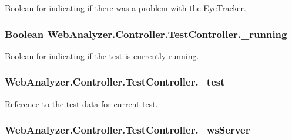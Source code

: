 Boolean for indicating if there was a problem with the Eye\+Tracker. 

\hypertarget{class_web_analyzer_1_1_controller_1_1_test_controller_a49aaaa975ccbeedcd52fb03288cea3ef}{}
\subsubsection[{\+\_\+running}]{\setlength{\rightskip}{0pt plus 5cm}Boolean Web\+Analyzer.\+Controller.\+Test\+Controller.\+\_\+running\hspace{0.3cm}{\ttfamily [private]}}\label{class_web_analyzer_1_1_controller_1_1_test_controller_a49aaaa975ccbeedcd52fb03288cea3ef}


Boolean for indicating if the test is currently running. 

\hypertarget{class_web_analyzer_1_1_controller_1_1_test_controller_a6084bcc401d37f7f8861fc0e9fb771b6}{}
\subsubsection[{\+\_\+test}]{ Web\+Analyzer.\+Controller.\+Test\+Controller.\+\_\+test\hspace{0.3cm}{\ttfamily [private]}}\label{class_web_analyzer_1_1_controller_1_1_test_controller_a6084bcc401d37f7f8861fc0e9fb771b6}


Reference to the test data for current test. 

\hypertarget{class_web_analyzer_1_1_controller_1_1_test_controller_aeb605e9f2ad9c53af52fb846fe2a98a6}{}
\subsubsection[{\+\_\+ws\+Server}]{ Web\+Analyzer.\+Controller.\+Test\+Controller.\+\_\+ws\+Server\hspace{0.3cm}{\ttfamily [private]}}\label{class_web_analyzer_1_1_controller_1_1_test_controller_aeb605e9f2ad9c53af52fb846fe2a98a6}


